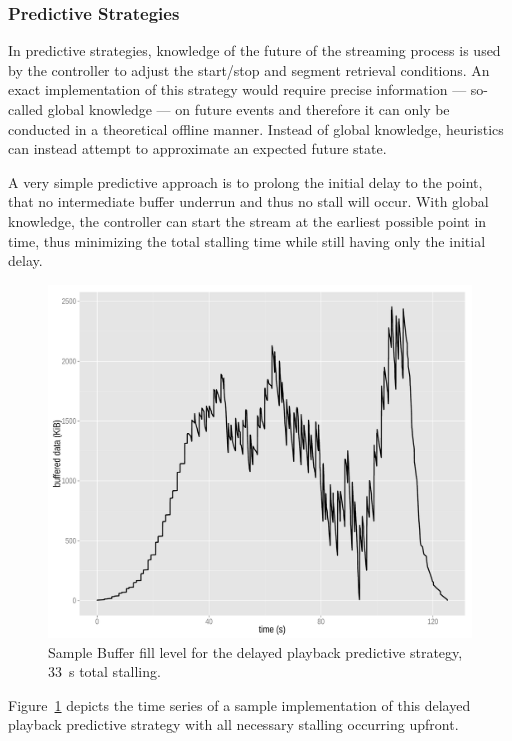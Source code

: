\subsubsection{Predictive Strategies}

In predictive strategies, knowledge of the future of the streaming process is used by the controller to adjust the start/stop and segment retrieval conditions. An exact implementation of this strategy would require precise information --- so-called global knowledge --- on future events and therefore it can only be conducted in a theoretical offline manner. Instead of global knowledge, heuristics can instead attempt to approximate an expected future state.

A very simple predictive approach is to prolong the initial delay to the point, that no intermediate buffer underrun and thus no stall will occur. With global knowledge, the controller can start the stream at the earliest possible point in time, thus minimizing the total stalling time while still having only the initial delay.

\begin{figure}[htb]
	\centering
	\includegraphics[width=1.0\textwidth]{images/R-bufferlevel-startdelay.pdf}
	\caption{Sample Buffer fill level for the delayed playback predictive strategy, \SI{33}{\second} total stalling.}
\label{c3:fig:bufferlevel-startdelay}
\end{figure}

Figure~\ref{c3:fig:bufferlevel-startdelay} depicts the time series of a sample implementation of this delayed playback predictive strategy with all necessary stalling occurring upfront.


